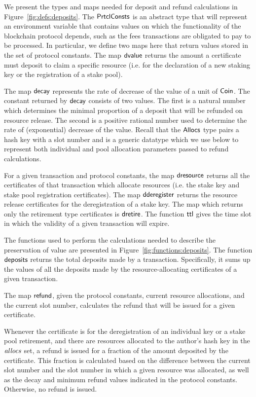 \documentclass[11pt,a4paper]{article}
\newcommand{\Coin}{\type{Coin}}
\newcommand{\PrtclConsts}{\type{PrtclConsts}}
\newcommand{\Allocs}{\type{Allocs}}
\theoremstyle{definition}
\theoremstyle{definition}
\begin{document}
We present the types and maps needed for deposit and
refund calculations in Figure~\ref{fig:defs:deposits}. The $\PrtclConsts$ is
an abstract type that will represent an environment variable that contains
values on which the functionality of the blockchain protocol depends, such
as the fees transactions are obligated to pay to be processed. In particular,
we define two maps here that return values stored in the set of protocol
constants. The map $\mathsf{dvalue}$ returns the amount a certificate must
deposit to claim a specific resource (i.e. for the declaration of a new staking
key or the registration of a stake pool).

The map $\mathsf{decay}$
represents the rate of decrease of the value of a unit of $\Coin$.
The constant returned by $\mathsf{decay}$ consists of two values. The first is
a natural number which determines the minimal proportion of a deposit that will
be refunded on resource release. The second is a positive rational number
used to determine the rate of (exponential) decrease of the value.
Recall that the $\Allocs$ type pairs a hash key with a slot number and is a generic datatype
which we use below to represent both individual and pool allocation
parameters passed to refund calculations.

For a given transaction and protocol constants, the map $\mathsf{dresource}$
returns all the certificates of that transaction which allocate resources
(i.e. the stake key and stake pool registration certificates). The map
$\mathsf{dderegister}$ returns the resource release certificates for the
deregistration of a stake key. The map which returns only
the retirement type certificates is $\mathsf{dretire}$. The function $\mathsf{ttl}$ gives the
time slot in which the validity of a given transaction will expire.

The functions used to perform the calculations needed to describe the
preservation of value
are presented in Figure~\ref{fig:functions:deposits}.
The function
$\mathsf{deposits}$ returns the total deposits made by a transaction. Specifically,
it sums up the values of all the deposits made by the resource-allocating
certificates of a given transaction.

The map $\mathsf{refund}$, given the protocol constants, current resource allocations, and
the current slot number, calculates the refund that will be issued
for a given certificate.

Whenever the certificate is for the deregistration of
an individual key or a stake pool retirement, and there are resources allocated
to the author's hash key in the $\mathit{allocs}$ set, a refund is issued for a
fraction of the amount deposited by the certificate. This fraction is calculated
based on the difference between the current slot number and the slot number in
which a given resource was allocated, as well as the
decay and minimum refund values indicated in the protocol constants.
Otherwise, no refund is issued.
\end{document}
